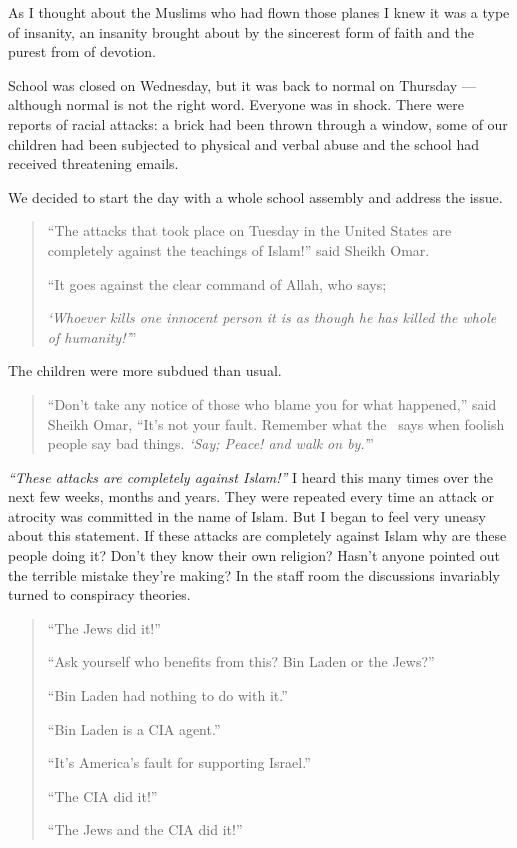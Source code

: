 \documentclass[12pt]{memoir}
\begin{document}
As I thought about the Muslims who had flown those planes
I knew it was a type of insanity,
an insanity brought about by the sincerest form of faith
and the purest from of devotion.

School was closed on Wednesday, but it was back to normal on Thursday —
although normal is not the right word.
Everyone was in shock.
There were reports of racial attacks:
a brick had been thrown through a window,
some of our children had been subjected to physical
and verbal abuse and the school had received threatening emails.

We decided to start the day with a whole school assembly
and address the issue.

\begin{quote}
“The attacks that took place on Tuesday in the United States
are completely against the teachings of Islam!” said Sheikh Omar.

“It goes against the clear command of Allah, who says;

\emph{‘Whoever kills one innocent person it is as though
he has killed the whole of humanity!’}”
\end{quote}

The children were more subdued than usual.

\begin{quote}
“Don’t take any notice of those who blame you for what happened,”
said Sheikh Omar, “It’s not your fault.
Remember what the \Quran\ says when foolish people say bad things.
\emph{‘Say; Peace! and walk on by.’}”
\end{quote}

\emph{“These attacks are completely against Islam!”}
I heard this many times over the next few weeks, months and years.
They were repeated every time an attack or atrocity was committed
in the name of Islam.
But I began to feel very uneasy about this statement.
If these attacks are completely against Islam why are these people doing it?
Don’t they know their own religion?
Hasn’t anyone pointed out the terrible mistake they’re making?
In the staff room the discussions invariably turned to conspiracy theories.

\begin{quote}
“The Jews did it!”

“Ask yourself who benefits from this? Bin Laden or the Jews?”

“Bin Laden had nothing to do with it.”

“Bin Laden is a CIA agent.”

“It’s America’s fault for supporting Israel.”

“The CIA did it!”

“The Jews and the CIA did it!”
\end{quote}
\end{document}

